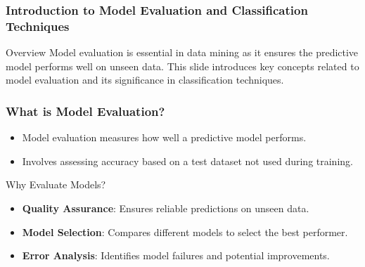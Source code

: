 \documentclass[aspectratio=169]{beamer}
\begin{document}
\frame{\titlepage}

\begin{frame}[fragile]
    \frametitle{Introduction to Model Evaluation and Classification Techniques}
    \begin{block}{Overview}
        Model evaluation is essential in data mining as it ensures the predictive model performs well on unseen data.
        This slide introduces key concepts related to model evaluation and its significance in classification techniques.
    \end{block}
\end{frame}

\begin{frame}[fragile]
    \frametitle{What is Model Evaluation?}
    \begin{itemize}
        \item Model evaluation measures how well a predictive model performs.
        \item Involves assessing accuracy based on a test dataset not used during training.
    \end{itemize}
    \begin{block}{Why Evaluate Models?}
        \begin{itemize}
            \item \textbf{Quality Assurance}: Ensures reliable predictions on unseen data.
            \item \textbf{Model Selection}: Compares different models to select the best performer.
            \item \textbf{Error Analysis}: Identifies model failures and potential improvements.
        \end{itemize}
    \end{block}
\end{frame}
\end{document}
